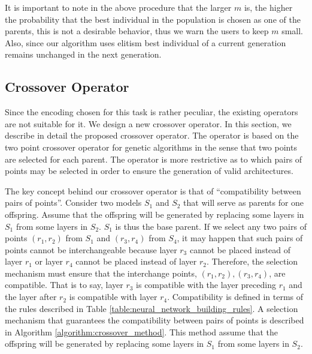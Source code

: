 \documentclass[preprint,12pt]{elsarticle}%
\begin{document}
It is important to note in the above procedure that the larger $m$ is, the higher the probability that the best individual in the population is chosen as one of the parents, this is not a desirable behavior, thus we warn the users to keep $m$ small. Also, since our algorithm uses elitism best individual of a current generation remains unchanged in the next generation.

\subsection{Crossover Operator}
\label{sec:crossover}

Since the encoding chosen for this task is rather peculiar, the existing operators are not suitable for it. We design a new crossover operator. In this section, we describe in detail the proposed crossover operator. The operator is based on the two point crossover operator for genetic algorithms \cite{holland1992} in the sense that two points are selected for each parent. The operator is more restrictive as to which pairs of points may be selected in order to ensure the generation of valid architectures. 

The key concept behind our crossover operator is that of  ``compatibility between pairs of points''. Consider two models $S_1$ and $S_2$ that will serve as parents for one offspring. Assume that the offspring will be generated by replacing some layers in $S_1$ from some layers in $S_2$.  $S_1$ is thus the base parent. If we select any two pairs of points $(r_1, r_2)$ from $S_1$ and $(r_3, r_4)$ from $S_4$, it may happen that such pairs of points cannot be interchangeable because layer $r_3$ cannot be placed instead of layer $r_1$ or layer $r_4$ cannot be placed instead of layer $r_2$. Therefore, the selection mechanism must ensure that the interchange points, $(r_1, r_2), (r_3, r_4)$, are compatible. That is to say, layer $r_3$ is compatible with the layer preceding $r_1$ and the layer after $r_2$ is compatible with layer $r_4$. Compatibility is defined in terms of the rules described in Table \ref{table:neural_network_building_rules}. A selection mechanism that guarantees the compatibility between pairs of points is described in Algorithm \ref{algorithm:crossover_method}. This method assume that the offspring will be generated by replacing some layers in $S_1$ from some layers in $S_2$.
\end{document}
